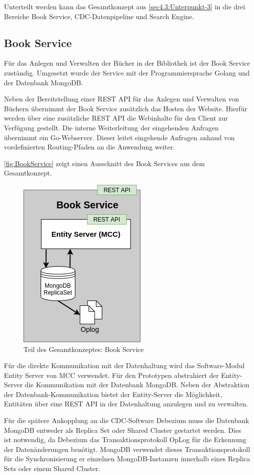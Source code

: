 Unterteilt werden kann das Gesamtkonzept aus \autoref{sec4.3:Unterpunkt-3} in die drei Bereiche \glqq Book Service\grqq{}, \glqq CDC-Datenpipeline\grqq{} und \glqq Search Engine\grqq{}.

\subsection{Book Service\label{sec5.2.1:Unterunterpunkt-1}}

Für das Anlegen und Verwalten der Bücher in der Bibliothek ist der Book Service zuständig. Umgesetzt wurde der Service mit der Programmiersprache Golang und der Datenbank MongoDB.

Neben der Bereitstellung einer REST API für das Anlegen und Verwalten von Büchern übernimmt der Book Service zusätzlich das Hosten der Website. Hierfür werden über eine zusätzliche REST API die Webinhalte für den Client zur Verfügung gestellt. Die interne Weiterleitung der eingehenden Anfragen übernimmt ein Go-Webserver. Dieser leitet eingehende Anfragen anhand von vordefinierten Routing-Pfaden an die Anwendung weiter.

\autoref{fig:BookService} zeigt einen Ausschnitt des Book Services aus dem Gesamtkonzept.

\begin{figure}[H]
    \centering
    \includegraphics[width=0.3\linewidth]{images/BookService.png}
    \caption{Teil des Gesamtkonzeptes: Book Service}
    \label{fig:BookService}
\end{figure}

Für die direkte Kommunikation mit der Datenhaltung wird das Software-Modul \glqq Entity Server\grqq{} von MCC verwendet. Für den Prototypen abstrahiert der Entity-Server die Kommunikation mit der Datenbank MongoDB. Neben der Abstraktion der Datenbank-Kommunikation bietet der Entity-Server die Möglichkeit, Entitäten über eine REST API in der Datenhaltung anzulegen und zu verwalten.

Für die spätere Ankopplung an die CDC-Software Debezium muss die Datenbank MongoDB entweder als \glqq Replica Set\grqq{} oder \glqq Shared Cluster\grqq{} gestartet werden. Dies ist notwendig, da Debezium das Transaktionsprotokoll \glqq OpLog\grqq{} für die Erkennung der Datenänderungen benötigt. MongoDB verwendet dieses Transaktionsprotokoll für die Synchronisierung er einzelnen MongoDB-Instanzen innerhalb eines Replica Sets oder einem Shared Cluster.

